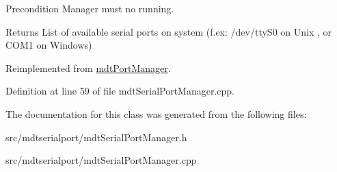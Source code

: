 \begin{DoxyPrecond}{Precondition}
Manager must no running. 
\end{DoxyPrecond}
\begin{DoxyReturn}{Returns}
List of available serial ports on system (f.ex: /dev/ttyS0 on Unix , or COM1 on Windows) 
\end{DoxyReturn}


Reimplemented from \hyperlink{classmdt_port_manager_ad56afb411ab5468005fca04767557ece}{mdtPortManager}.



Definition at line 59 of file mdtSerialPortManager.cpp.



The documentation for this class was generated from the following files:\begin{DoxyCompactItemize}
\item 
src/mdtserialport/mdtSerialPortManager.h\item 
src/mdtserialport/mdtSerialPortManager.cpp\end{DoxyCompactItemize}
